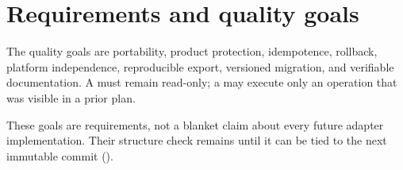 \section{Requirements and quality goals}
\label{chap:requirements-quality-goals}

The quality goals are portability, product protection, idempotence, rollback,
platform independence, reproducible export, versioned migration, and verifiable
documentation. A \CheckMode{} must remain read-only; a \FullFix{} may execute only an
operation that was visible in a prior plan.


These goals are requirements, not a blanket claim about every future adapter
implementation. Their structure check remains \Planned{} until it can be tied to the
next immutable commit ().
